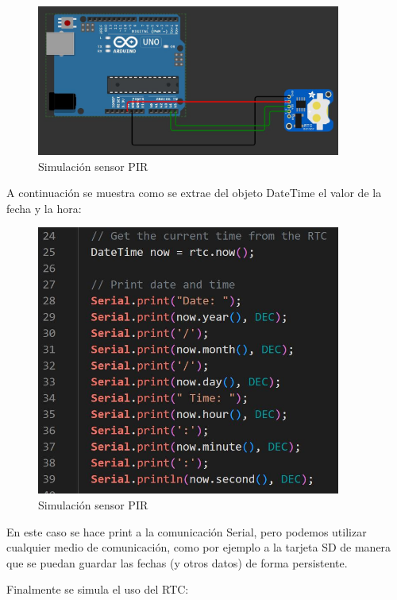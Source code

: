 \begin{figure}[H]
    \centering
    \includegraphics[width = 10cm]{ImagenesLatex/rtc_circuit.JPG}{}
    \caption{Simulación sensor PIR}
\end{figure}

A continuación se muestra como se extrae del objeto DateTime el valor de la fecha y la hora:
\begin{figure}[H]
    \centering
    \includegraphics[width = 10cm]{ImagenesLatex/code_rtc.JPG}{}
    \caption{Simulación sensor PIR}
\end{figure}

En este caso se hace print a la comunicación Serial, pero podemos utilizar cualquier medio de comunicación, como por ejemplo a la tarjeta SD de manera que se puedan guardar las fechas (y otros datos) de forma persistente.

Finalmente se simula el uso del RTC:

